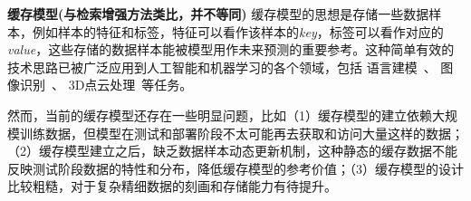 \documentclass[12pt]{article}
\begin{document}
\textbf{缓存模型(与检索增强方法类比，并不等同)}
缓存模型的思想是存储一些数据样本，例如样本的特征和标签，特征可以看作该样本的\emph{key}，标签可以看作对应的\emph{value}，这些存储的数据样本能被模型用作未来预测的重要参考。这种简单有效的技术思路已被广泛应用到人工智能和机器学习的各个领域，包括
语言建模~\cite{grave17unbounded,merity17pointer,khandelwal20generalization}、
图像识别~\cite{vinyals16mn,snell17prototypical,chen18a,chen21meta-baseline,iwasawa21t3a,choi22improving,udandarao23sus-x,zhang22tip-adapter,zhang23cafo,karmanov24tda}、
3D点云处理~\cite{zhang23pointnn,tang24pointpeft,wang24bftt3d,sun25pointcache,tamjidi2025uniadapter}等任务。

然而，当前的缓存模型还存在一些明显问题，比如（1）缓存模型的建立依赖大规模训练数据，但模型在测试和部署阶段不太可能再去获取和访问大量这样的数据；（2）缓存模型建立之后，缺乏数据样本动态更新机制，这种静态的缓存数据不能反映测试阶段数据的特性和分布，降低缓存模型的参考价值；（3）缓存模型的设计比较粗糙，对于复杂精细数据的刻画和存储能力有待提升。
\end{document}
